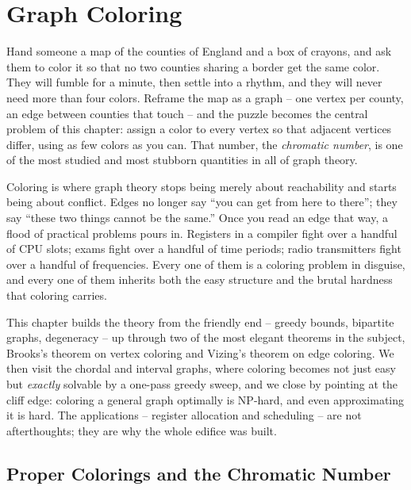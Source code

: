 \chapter{Graph Coloring}

\providecommand{\degen}{\operatorname{degen}}

Hand someone a map of the counties of England and a box of crayons, and ask them
to color it so that no two counties sharing a border get the same color. They
will fumble for a minute, then settle into a rhythm, and they will never need
more than four colors. Reframe the map as a graph -- one vertex per county, an
edge between counties that touch -- and the puzzle becomes the central problem of
this chapter: assign a color to every vertex so that adjacent vertices differ,
using as few colors as you can. That number, the \emph{chromatic number}, is one
of the most studied and most stubborn quantities in all of graph theory.

Coloring is where graph theory stops being merely about reachability and starts
being about conflict. Edges no longer say ``you can get from here to there''; they
say ``these two things cannot be the same.'' Once you read an edge that way, a
flood of practical problems pours in. Registers in a compiler fight over a handful
of CPU slots; exams fight over a handful of time periods; radio transmitters fight
over a handful of frequencies. Every one of them is a coloring problem in
disguise, and every one of them inherits both the easy structure and the brutal
hardness that coloring carries.

This chapter builds the theory from the friendly end -- greedy bounds, bipartite
graphs, degeneracy -- up through two of the most elegant theorems in the subject,
Brooks's theorem on vertex coloring and Vizing's theorem on edge coloring. We then
visit the chordal and interval graphs, where coloring becomes not just easy but
\emph{exactly} solvable by a one-pass greedy sweep, and we close by pointing at the
cliff edge: coloring a general graph optimally is NP-hard, and even approximating
it is hard. The applications -- register allocation and scheduling -- are not
afterthoughts; they are why the whole edifice was built.

\chapterline

\section{Proper Colorings and the Chromatic Number}
\label{ch28:basics}

